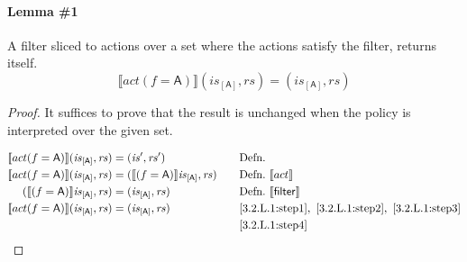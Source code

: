 \documentclass[12pt, letterpaper]{article}
\newcommand\interp[1]{\llbracket #1 \rrbracket}
\begin{document}
 \paragraph{Lemma \#1}
     A filter sliced to actions over a set where the actions satisfy the filter, returns itself.
 \[
     \interp{ act(f=\mathsf{A}) } (\mathit{is}_{[\mathsf{A}]}, \mathit{rs}) = (\mathit{is_{[\mathsf{A}]}}, \mathit{rs})
 \]
 \begin{proof}
     It suffices to prove that the result is unchanged when the policy is interpreted over the given set.
     \par\nobreak
     {\fontsize{10pt}{12pt}\selectfont
     \begin{alignat}{2}
         \setcounter{equation}{0}
         \label{3.2.L.1:step1}
         \interp{ act(f=\mathsf{A}) } (\mathit{is}_{[\mathsf{A}]}, \mathit{rs})
         &= 
         (\mathit{is}', \mathit{rs}')
         &&\quad \text{Defn.}
         \\
         \label{3.2.L.1:step2}
         \interp{ act(f=\mathsf{A}) } (\mathit{is}_{[\mathsf{A}]}, \mathit{rs})
         &= 
         (\interp{ (f=\mathsf{A}) } \mathit{is}_{[\mathsf{A}]}, \mathit{rs})
         &&\quad \text{Defn.}\ \interp{act}\\
         \label{3.2.L.1:step3}
         (\interp{ (f=\mathsf{A}) } \mathit{is}_{[\mathsf{A}]}, \mathit{rs})
         &=
         (\mathit{is}_{[\mathsf{A}]}, \mathit{rs})
         &&\quad \text{Defn.}\ \interp{\mathsf{filter}}\\
         \label{3.2.L.1:step4}
         \interp{ act(f=\mathsf{A}) } (\mathit{is}_{[\mathsf{A}]}, \mathit{rs})
         &=
         (\mathit{is}_{[\mathsf{A}]}, \mathit{rs})
         &&\quad \ref{3.2.L.1:step1},\ \ref{3.2.L.1:step2},\ \ref{3.2.L.1:step3}\\
         \label{3.2.L.1:QED}
         &\qedhere
         &&\quad \ref{3.2.L.1:step4}
     \end{alignat}
     }%
 \end{proof}
\end{document}
